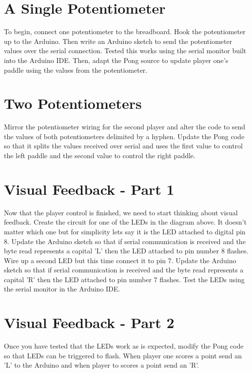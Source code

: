 \documentclass{../../../fal_assignment}
\begin{document}
\section{A Single Potentiometer} \label{arduino-first}
To begin, connect one potentiometer to the breadboard. Hook the potentiometer up to the Arduino. Then write an Arduino sketch to send the potentiometer values over the serial connection. Tested this works using the serial monitor built into the Arduino IDE. Then, adapt the Pong source to update player one's paddle using the values from the potentiometer. 

\section{Two Potentiometers} \label{arduino-second}
Mirror the potentiometer wiring for the second player and alter the code to send the values of both potentiometers delimited by a hyphen. Update the Pong code so that it splits the values received over serial and uses the first value to control the left paddle and the second value to control the right paddle. 

\section{Visual Feedback - Part 1} \label{arduino-third}
Now that the player control is finished, we need to start thinking about visual feedback. Create the circuit for one of the LEDs in the diagram above. It doesn't matter which one but for simplicity lets say it is the LED attached to digital pin 8. Update the Arduino sketch so that if serial communication is received and the byte read represents a capital 'L' then the LED attached to pin number 8 flashes. Wire up a second LED but this time connect it to pin 7. Update the Arduino sketch so that if serial communication is received and the byte read represents a capital 'R' then the LED attached to pin number 7 flashes. Test the LEDs using the serial monitor in the Arduino IDE. 

\section{Visual Feedback - Part 2} \label{arduino-fourth}
Once you have tested that the LEDs work as is expected, modify the Pong code so that LEDs can be triggered to flash. When player one scores a point send an 'L' to the Arduino and when player to scores a point send an 'R'.
\end{document}
